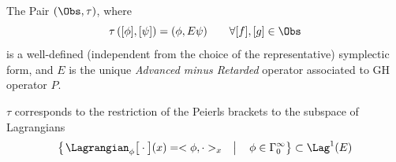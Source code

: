 \documentclass[a4paper,11pt]{scrartcl}
\begin{document}
	\begin{definition}
		The Pair $(\Obs, \tau)$, where
		$$ \tau\left( [\phi] , [\psi] \right) = (\phi, E \psi) \qquad \forall [f], [g] \in \Obs $$
		is a well-defined (independent from the choice of the representative) symplectic form,
		and $E$ is the unique \emph{Advanced minus Retarded} operator associated to GH operator $P$.
	\end{definition}
	\begin{theorem}
		$\tau$ corresponds to the restriction of the Peierls brackets to the subspace of Lagrangians
		$$\left\{\left. \Lagrangian_\phi \big[\cdot \big] ( x ) = <\phi, \cdot>_x \quad \right\vert  \quad
		\phi \in \Gamma_0^\infty \right\} \subset \Lag^1(E)$$
	\end{theorem}
\end{document}
